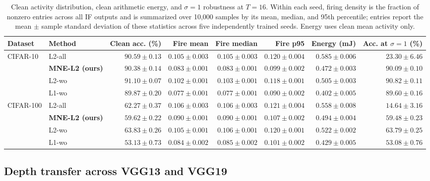 \documentclass{article}
\begin{document}
\begin{table}[t]
\caption{Clean activity distribution, clean arithmetic energy, and $\sigma=1$ robustness at $T=16$. Within each seed, firing density is the fraction of nonzero entries across all IF outputs and is summarized over 10,000 samples by its mean, median, and 95th percentile; entries report the mean $\pm$ sample standard deviation of these statistics across five independently trained seeds. Energy uses clean mean activity only.}
\label{tab:cifar-activity-full}
\centering
\scriptsize
\setlength{\tabcolsep}{2.2pt}
\begin{tabular}{llrrrrrr}
\toprule
Dataset & Method & Clean acc. (\%) & Fire mean & Fire median & Fire p95 & Energy (mJ) & Acc. at $\sigma=1$ (\%) \\
\midrule
CIFAR-10 & L2-all          & $90.59\pm0.13$ & $0.105\pm0.003$ & $0.105\pm0.003$ & $0.120\pm0.004$ & $0.585\pm0.006$ & $23.30\pm6.46$ \\
         & \textbf{MNE-L2 (ours)} & $90.38\pm0.14$ & $0.083\pm0.001$ & $0.083\pm0.001$ & $0.099\pm0.002$ & $0.472\pm0.003$ & $90.09\pm0.10$ \\
         & L2-wo           & $91.10\pm0.07$ & $0.102\pm0.001$ & $0.103\pm0.001$ & $0.118\pm0.001$ & $0.505\pm0.003$ & $90.82\pm0.11$ \\
         & L1-wo           & $89.87\pm0.20$ & $0.077\pm0.001$ & $0.077\pm0.001$ & $0.090\pm0.002$ & $0.402\pm0.005$ & $89.60\pm0.16$ \\
\midrule
CIFAR-100 & L2-all          & $62.27\pm0.37$ & $0.106\pm0.003$ & $0.106\pm0.003$ & $0.121\pm0.004$ & $0.558\pm0.008$ & $14.64\pm3.16$ \\
          & \textbf{MNE-L2 (ours)} & $59.62\pm0.22$ & $0.090\pm0.001$ & $0.090\pm0.001$ & $0.107\pm0.002$ & $0.494\pm0.004$ & $59.48\pm0.23$ \\
          & L2-wo           & $63.83\pm0.26$ & $0.105\pm0.001$ & $0.106\pm0.001$ & $0.120\pm0.001$ & $0.522\pm0.002$ & $63.79\pm0.25$ \\
          & L1-wo           & $53.13\pm0.73$ & $0.084\pm0.002$ & $0.085\pm0.002$ & $0.101\pm0.002$ & $0.429\pm0.005$ & $53.08\pm0.76$ \\
\bottomrule
\end{tabular}
\end{table}

\FloatBarrier

\subsection{Depth transfer across VGG13 and VGG19}
\label{app:depth-transfer}
\end{document}

